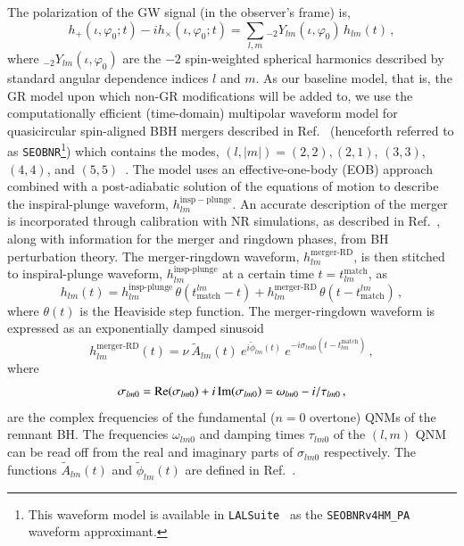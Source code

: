 \documentclass[twocolumn,
               prd,
               aps,
               superscriptaddress,
               tightenlines,
               nofootinbib,
               eqsecnum,
               amsfonts,
               amsmath,
               longbibliography]{revtex4-1}
\newcommand{\SEOB}{\texttt{SEOBNR}}
\begin{document}
The polarization of the GW signal (in the observer's frame) is,
%
\begin{equation}
h_+(\iota,\varphi_0;t ) - i h_\times(\iota,\varphi_0;t) = \sum_{l, m} {}_{-\!2}Y_{l m}(\iota,\varphi_0)\, h_{l m}(t)\,,
\end{equation}
%
where ${}_{-\!2}Y_{l m}(\iota,\varphi_0)$ are the $-2$ spin-weighted spherical
harmonics described by standard angular dependence indices $l$ and $m$.
%
%
As our baseline model, that is, the GR model upon which non-GR modifications will be added to, we use the computationally efficient (time-domain) multipolar waveform model for quasicircular spin-aligned BBH mergers described in Ref.~\cite{Mihaylov:2021bpf} (henceforth referred to as \SEOB{}\footnote{This waveform model is available in \texttt{LALSuite}~\cite{lalsuite} as the \texttt{SEOBNRv4HM\_PA} waveform approximant.}) which contains the modes, $(l, |m|)=(2,2),(2,1)$, $(3,3)$, $(4,4)$, and $(5,5)$~\cite{Cotesta:2018fcv,Mihaylov:2021bpf}.
%
The model uses an effective-one-body (EOB) approach combined with a
post-adiabatic solution of the equations of motion to describe the
inspiral-plunge waveform, $h_{l m}^\mathrm{insp-plunge}$.
%
An accurate description of the merger is incorporated through calibration with
NR simulations, as described in Ref.~\cite{Cotesta:2018fcv}, along with
information for the merger and ringdown phases, from BH perturbation theory.
The merger-ringdown waveform, $h_{l m}^\textrm{merger-RD}$, is then stitched to
inspiral-plunge waveform, $h_{l m}^\textrm{insp-plunge}$ at a certain time $t = t^{\textrm{match}}_{l m}$, as
%
\begin{equation}
h_{l m}(t) =
h_{l m}^\textrm{insp-plunge}\, \theta(t_\textrm{match}^{l m} - t)
+ h_{l m}^\textrm{merger-RD}\,\theta(t-t_\textrm{match}^{l m})\,,
\end{equation}
%
where $\theta(t)$ is the Heaviside step function.
%
The merger-ringdown waveform is expressed as an exponentially damped
sinusoid~\cite{Bohe:2016gbl,Cotesta:2018fcv,Mihaylov:2021bpf}
%
\begin{equation}
\label{RD}
h_{l m}^{\textrm{merger-RD}}(t) = \nu \ \tilde{A}_{l m}(t)\ e^{i \tilde{\phi}_{l m}(t)} \ e^{-i \sigma_{l m 0}(t-t^{\textrm{match}}_{l m})}\,,
\end{equation}
%
where
%
\begin{align}
\sigma_{l m 0} = {\rm Re}(\sigma_{l m 0}) + i \, {\rm Im}(\sigma_{l m 0})
= \omega_{l m 0} - i / \tau_{l m 0}\,,
\end{align}
%
are the complex frequencies of the fundamental ($n=0$ overtone) QNMs of the remnant BH.
%
The frequencies $\omega_{l m 0}$ and damping times $\tau_{l m 0}$ of the $(l,
m)$ QNM can be read off from the real and imaginary parts of $\sigma_{l m 0}$
respectively.
%
The functions $\tilde{A}_{l m}(t)$ and $\tilde{\phi}_{l m}(t)$ are defined
in Ref.~\cite{Bohe:2016gbl,Cotesta:2018fcv}.
\end{document}
